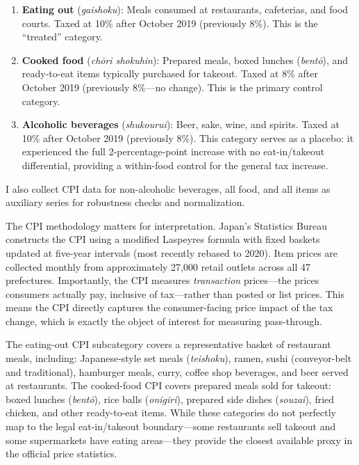 \documentclass[12pt]{article}
\begin{document}
\begin{enumerate}
\item \textbf{Eating out} (\textit{gaishoku}): Meals consumed at restaurants, cafeterias, and food courts. Taxed at 10\% after October 2019 (previously 8\%). This is the ``treated'' category.

\item \textbf{Cooked food} (\textit{ch\={o}ri shokuhin}): Prepared meals, boxed lunches (\textit{bent\={o}}), and ready-to-eat items typically purchased for takeout. Taxed at 8\% after October 2019 (previously 8\%---no change). This is the primary control category.

\item \textbf{Alcoholic beverages} (\textit{shukourui}): Beer, sake, wine, and spirits. Taxed at 10\% after October 2019 (previously 8\%). This category serves as a placebo: it experienced the full 2-percentage-point increase with no eat-in/takeout differential, providing a within-food control for the general tax increase.
\end{enumerate}

I also collect CPI data for non-alcoholic beverages, all food, and all items as auxiliary series for robustness checks and normalization.

The CPI methodology matters for interpretation. Japan's Statistics Bureau constructs the CPI using a modified Laspeyres formula with fixed baskets updated at five-year intervals (most recently rebased to 2020). Item prices are collected monthly from approximately 27,000 retail outlets across all 47 prefectures. Importantly, the CPI measures \textit{transaction} prices---the prices consumers actually pay, inclusive of tax---rather than posted or list prices. This means the CPI directly captures the consumer-facing price impact of the tax change, which is exactly the object of interest for measuring pass-through.

The eating-out CPI subcategory covers a representative basket of restaurant meals, including: Japanese-style set meals (\textit{teishoku}), ramen, sushi (conveyor-belt and traditional), hamburger meals, curry, coffee shop beverages, and beer served at restaurants. The cooked-food CPI covers prepared meals sold for takeout: boxed lunches (\textit{bent\={o}}), rice balls (\textit{onigiri}), prepared side dishes (\textit{souzai}), fried chicken, and other ready-to-eat items. While these categories do not perfectly map to the legal eat-in/takeout boundary---some restaurants sell takeout and some supermarkets have eating areas---they provide the closest available proxy in the official price statistics.
\end{document}
